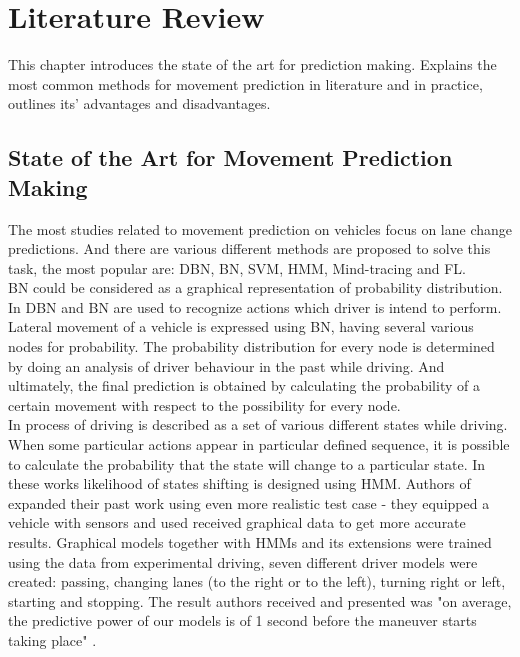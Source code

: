 \chapter{Literature Review}
\label{chap:1}
%
This chapter introduces the state of the art for prediction making. Explains the most common methods for movement prediction in literature and in practice, outlines its' advantages and disadvantages. 

\section{State of the Art for Movement Prediction Making}

The most studies related to movement prediction on vehicles focus on lane change predictions. And there are various different methods are proposed to solve this task, the most popular are: \gls{DBN}, \gls{BN}, \gls{SVM}, \gls{HMM}, Mind-tracing and \gls{FL}. \\
\gls{BN} could be considered as a graphical representation of probability distribution. In \cite{BN1, BN2} \gls{DBN} and \gls{BN} are used to recognize actions which driver is intend to perform. Lateral movement of a vehicle is expressed using \gls{BN}, having several various nodes for probability. The probability distribution for every node is determined by doing an analysis of driver behaviour in the past while driving. And ultimately, the final prediction is obtained by calculating the probability of a certain movement with respect to the possibility for every node. \\
In \cite{Markov1, Markov2} process of driving is described as a set of various different states while driving. When some particular actions appear in particular defined sequence, it is possible to calculate the probability that the state will change to a particular state. In these works likelihood of states shifting is designed using \gls{HMM}. Authors of \cite{Markov3, Markov4} expanded their past work using even more realistic test case - they equipped a vehicle with sensors and used received graphical data to get more accurate results. Graphical models together with \glspl{HMM}  and its extensions were trained using the data from experimental driving,  seven different driver models were created: passing, changing lanes (to the right or to the left), turning right or left, starting and stopping. The result authors received and presented was "on average, the predictive power of our models is of 1 second before the maneuver starts taking place" \cite{Markov4}. \\

